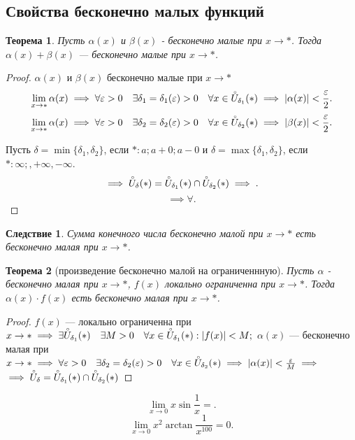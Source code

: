 \documentclass[a4paper,12pt]{article} %
\newtheorem{theorem}{Теорема}[section]
\newtheorem{corollary}{Следствие}[theorem]
\theoremstyle{remark}
\theoremstyle{definition}
\begin{document}
\subsection{Свойства бесконечно малых функций}
\begin{theorem}
	Пусть $\alpha(x)$ и  $\beta(x)$ - бесконечно малые при  $x\to *$. Тогда $\alpha(x) + \beta(x)$ --- бесконечно малые при  $x\to *$.
\end{theorem}
\begin{proof}
	$\alpha(x)$ и  $\beta(x)$ бесконечно малые при  $x\to *$ 
	\[
		\lim_{x \to *} \alpha(x) \implies \forall \varepsilon> 0 \quad \exists \delta_1=\delta_1(\varepsilon)>0 \quad \forall x\in \accentset {\circ}{U}_{\delta_1}(*) \implies |\alpha(x)| < \frac{\varepsilon}{2}	
	.\] 
	\[
		\lim_{x \to *} \alpha(x) \implies \forall \varepsilon> 0 \quad \exists \delta_2=\delta_2(\varepsilon)>0 \quad \forall x\in \accentset    {\circ}{U}_{\delta_2}(*) \implies |\beta(x)| < \frac{\varepsilon}{2}	
	.\] 

	Пусть $\delta = \min \{\delta_1, \delta_2\} $, если $*: a; a + 0; a - 0$ и  $\delta=\max \{\delta_1, \delta_2\} $, если $*: \infty;, +\infty, -\infty$.
	\[
		\implies \accentset{\circ}{U}_\delta(*) = \accentset{\circ}{U}_{\delta_1}(*) \cap \accentset{\circ}{U}_{\delta_2}(*) \implies
	.\] 
	\[
	\implies \forall 
	.\] 
	
\end{proof}

\begin{corollary}
Сумма конечного числа бесконечно малой при $x\to *$ есть бесконечно малая при $x \to  *$.
\end{corollary}

\begin{theorem}[произведение бесконечно малой на ограниченнную]
	Пусть $\alpha$ - бесконечно малая при $x \to *$, $f(x)$ локально ограниченна при  $x\to *$. Тогда $\alpha(x)\cdot f(x)$ есть бесконечно малая при $x\to *$.
\end{theorem}
	\begin{proof}
		$f(x)$ --- локально ограниченна при $x\to * \implies \exists \accentset{\circ}{U}_{\delta_1}(*) \quad \exists M>0 \quad \forall x \in  \accentset{\circ}{U}_{\delta_1}(*) : |f(x)| < M;$
		$\alpha(x)$ --- бесконечно малая при $x \to  * \implies \forall \varepsilon> 0 \quad \exists \delta_2=\delta_2(\varepsilon)>0 \quad \forall x\in \accentset    {\circ}{U}_{\delta_2}(*) \implies |\alpha(x)| < \frac{\varepsilon}{M} \implies$
		$\implies \accentset{\circ}{U}_\delta=\accentset{\circ}{U}_{\delta_1}(*)\cap \accentset{\circ}{U}_{\delta_2}(*)$

	\end{proof}
\[
	\lim_{x \to 0} x \sin{\frac{1}{x}} = 
.\] 
\[
	\lim_{x \to 0} x^2 \arctan{\frac{1}{x^{100}}} = 0
.\] 
\end{document}
